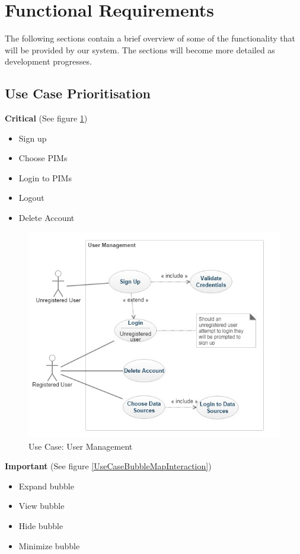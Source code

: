 \documentclass[hidelinks,english]{article}
\begin{document}
	\section{Functional Requirements}		

		The following sections contain a brief overview of some of the functionality that will be provided by our system. The sections will become more detailed as development progresses.
		\subsection{Use Case Prioritisation}
			\textbf{Critical} (See figure \ref{UseCaseUserManagement})
			\begin{itemize}
			    \item Sign up
			    \item Choose PIMs
			    \item Login to PIMs
			    \item Logout
			    \item Delete Account
			\end{itemize}
			\begin{figure}[!h]
				\includegraphics[width=\linewidth]{UserManagement.jpg}
				\caption{Use Case: User Management}
				\label{UseCaseUserManagement}
			\end{figure}
			\textbf{Important} (See figure \ref{UseCaseBubbleMapInteraction})
			\begin{itemize}
			    \item Expand bubble
			   	\item View bubble
			    \item Hide bubble
			    \item Minimize bubble
			\end{itemize}
\end{document}
